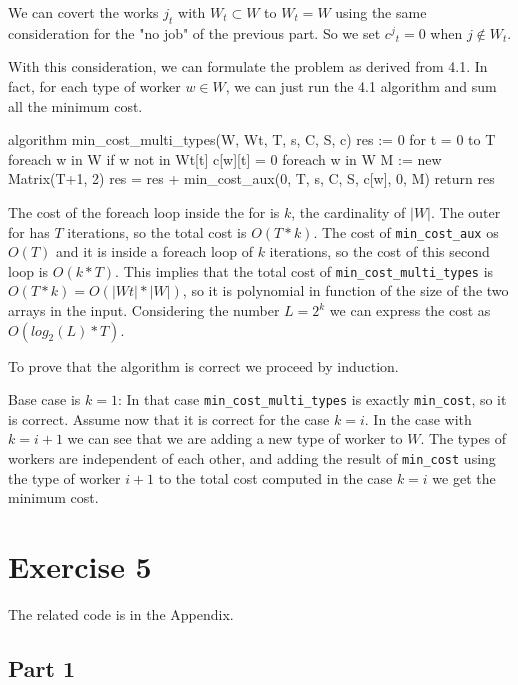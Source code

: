 \documentclass[paper=a4, fontsize=11pt]{scrartcl} %
\numberwithin{equation}{section} %
\numberwithin{figure}{section} %
\numberwithin{table}{section} %
\begin{document}
We can covert the works $j_t$ with $W_t \subset W$ to $W_t = W$ using the same consideration for the "no job" of the previous part.
So we set ${c^j}_t = 0$ when $j \notin W_t$.

With this consideration, we can formulate the problem as derived from 4.1.
In fact, for each type of worker $w \in W$, we can just run the 4.1 algorithm and sum all the minimum cost.

\begin{pseudo}
algorithm min_cost_multi_types(W, Wt, T, s, C, S, c)
    res := 0
    for t = 0 to T
        foreach w in W
            if w not in Wt[t]
                c[w][t] = 0
    foreach w in W
        M := new Matrix(T+1, 2)
        res = res + min_cost_aux(0, T, s, C, S, c[w], 0, M)
    return res
\end{pseudo}

The cost of the foreach loop inside the for is $k$, the cardinality of $|W|$.
The outer for has $T$ iterations, so the total cost is $O(T*k)$.
The cost of \verb|min_cost_aux| os $O(T)$ and it is inside a foreach loop of $k$ iterations, so the cost of this second loop is $O(k*T)$.
This implies that the total cost of \verb|min_cost_multi_types| is $O(T*k) = O(|Wt|*|W|)$, so it is polynomial in function of the size of the two arrays in the input.
Considering the number $L = 2^k$ we can express the cost as $O(log_2(L)*T)$.

To prove that the algorithm is correct we proceed by induction.

Base case is $k=1$: In that case \verb|min_cost_multi_types| is exactly \verb|min_cost|, so it is correct.
Assume now that it is correct for the case $k = i$.
In the case with $k = i+1$ we can see that we are adding a new type of worker to $W$.
The types of workers are independent of each other, and adding the result of \verb|min_cost| using the type of worker $i+1$ to the total cost computed in the case $k=i$ we get the minimum cost.



\newpage
\section*{Exercise 5}

The related code is in the Appendix.

\subsection*{Part 1}
\end{document}

